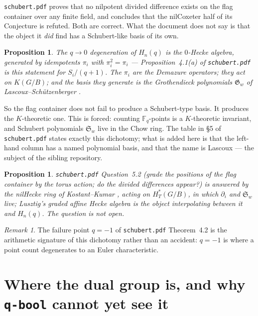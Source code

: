 \documentclass[11pt,a4paper]{article}
\newtheorem{proposition}[theorem]{Proposition}
\theoremstyle{definition}
\theoremstyle{remark}
\newtheorem{remark}[theorem]{Remark}
\newcommand{\FF}{\mathbb{F}}
\newcommand{\Schub}{\mathfrak{S}}
\newcommand{\Groth}{\mathfrak{G}}
\begin{document}
\texttt{schubert.pdf} proves that no nilpotent divided difference exists on the
flag container over any finite field, and concludes that the nilCoxeter half of
its Conjecture is refuted. Both are correct. What the document does not say is
that the object it \emph{did} find has a Schubert-like basis of its own.

\begin{proposition}\label{prop:zero}
The $q \to 0$ degeneration of $H_n(q)$ is the $0$-Hecke algebra, generated by
idempotents $\pi_i$ with $\pi_i^2 = \pi_i$ --- Proposition~4.1(a) of
\texttt{schubert.pdf} is this statement for $S_i/(q+1)$. The $\pi_i$ are the
Demazure operators; they act on $K(G/B)$; and the basis they generate is the
\emph{Grothendieck polynomials} $\Groth_w$ of Lascoux--Sch\"utzenberger
\cite{LS82}.
\end{proposition}

So the flag container does not fail to produce a Schubert-type basis. It
produces the $K$-theoretic one. This is forced: counting $\FF_q$-points is a
$K$-theoretic invariant, and Schubert polynomials $\Schub_w$ live in the Chow
ring. The table in \S5 of \texttt{schubert.pdf} states exactly this dichotomy;
what is added here is that the left-hand column has a named polynomial basis,
and that the name is Lascoux --- the subject of the sibling repository.

\begin{proposition}\label{prop:nilhecke}
\texttt{schubert.pdf} Question~5.2 (grade the positions of the flag container
by the torus action; do the divided differences appear?) is answered by the
nilHecke ring of Kostant--Kumar \cite{KK86}, acting on $H^*_T(G/B)$, in which
$\partial_i$ and $\Schub_w$ live; Lusztig's graded affine Hecke algebra
\cite{Lusztig89} is the object interpolating between it and $H_n(q)$. The
question is not open.
\end{proposition}

\begin{remark}
The failure point $q = -1$ of \texttt{schubert.pdf} Theorem~4.2 is the
arithmetic signature of this dichotomy rather than an accident: $q = -1$ is
where a point count degenerates to an Euler characteristic.
\end{remark}

\section{Where the dual group is, and why \texttt{q-bool} cannot yet see
it}\label{sec:dual}
\end{document}
